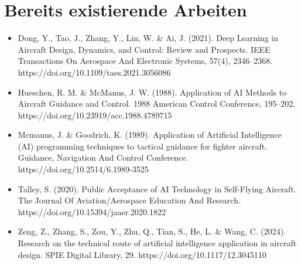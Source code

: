 \documentclass[12pt,a4paper]{article}
\begin{document}
	\section{Bereits existierende Arbeiten}
	\begin{itemize}
		\item{Dong, Y., Tao, J., Zhang, Y., Lin, W. \& Ai, J. (2021). Deep Learning in Aircraft Design, Dynamics, and Control: Review and Prospects. IEEE Transactions On Aerospace And Electronic Systems, 57(4), 2346–2368.\\https://doi.org/10.1109/taes.2021.3056086}
		\item{Hueschen, R. M. \& McManus, J. W. (1988). Application of AI Methods to Aircraft Guidance and Control. 1988 American Control Conference, 195–202. https://doi.org/10.23919/acc.1988.4789715}
		\item{Mcmanus, J. \& Goodrich, K. (1989). Application of Artificial Intelligence (AI) programming techniques to tactical guidance for fighter aircraft. Guidance, Navigation And Control Conference. https://doi.org/10.2514/6.1989-3525}
		\item{Talley, S. (2020). Public Acceptance of AI Technology in Self-Flying Aircraft. The Journal Of Aviation/Aerospace Education And Research. \\https://doi.org/10.15394/jaaer.2020.1822}
		\item{Zeng, Z., Zhang, S., Zou, Y., Zhu, Q., Tian, S., He, L. \& Wang, C. (2024). Research on the technical route of artificial intelligence application in aircraft design. SPIE Digital Library, 29. https://doi.org/10.1117/12.3045110}
		
	\end{itemize}
	
\end{document}
